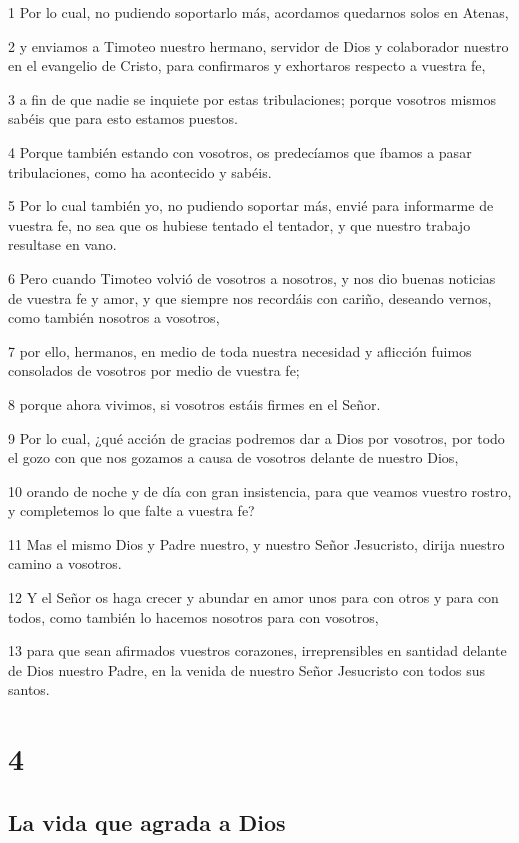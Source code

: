 \par 1 Por lo cual, no pudiendo soportarlo más, acordamos quedarnos solos en Atenas,
\par 2 y enviamos a Timoteo nuestro hermano, servidor de Dios y colaborador nuestro en el evangelio de Cristo, para confirmaros y exhortaros respecto a vuestra fe,
\par 3 a fin de que nadie se inquiete por estas tribulaciones; porque vosotros mismos sabéis que para esto estamos puestos.
\par 4 Porque también estando con vosotros, os predecíamos que íbamos a pasar tribulaciones, como ha acontecido y sabéis.
\par 5 Por lo cual también yo, no pudiendo soportar más, envié para informarme de vuestra fe, no sea que os hubiese tentado el tentador, y que nuestro trabajo resultase en vano.
\par 6 Pero cuando Timoteo volvió de vosotros a nosotros, y nos dio buenas noticias de vuestra fe y amor, y que siempre nos recordáis con cariño, deseando vernos, como también nosotros a vosotros,
\par 7 por ello, hermanos, en medio de toda nuestra necesidad y aflicción fuimos consolados de vosotros por medio de vuestra fe;
\par 8 porque ahora vivimos, si vosotros estáis firmes en el Señor.
\par 9 Por lo cual, ¿qué acción de gracias podremos dar a Dios por vosotros, por todo el gozo con que nos gozamos a causa de vosotros delante de nuestro Dios,
\par 10 orando de noche y de día con gran insistencia, para que veamos vuestro rostro, y completemos lo que falte a vuestra fe?
\par 11 Mas el mismo Dios y Padre nuestro, y nuestro Señor Jesucristo, dirija nuestro camino a vosotros.
\par 12 Y el Señor os haga crecer y abundar en amor unos para con otros y para con todos, como también lo hacemos nosotros para con vosotros,
\par 13 para que sean afirmados vuestros corazones, irreprensibles en santidad delante de Dios nuestro Padre, en la venida de nuestro Señor Jesucristo con todos sus santos.

\chapter{4}

\section*{La vida que agrada a Dios}

